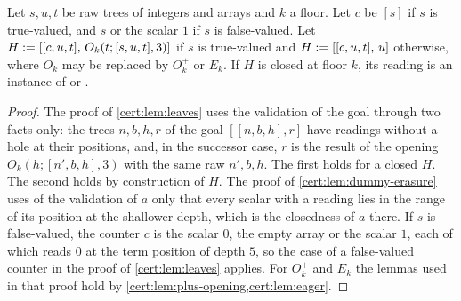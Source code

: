 \begin{lemma}\label{cert:lem:closed-leaf}
Let $s,u,t$ be raw trees of integers and arrays and $k$ a floor. Let $c$ be
$[s]$ if $s$ is true-valued, and $s$ or the scalar $1$ if $s$ is
false-valued. Let $H\mathrel{:=}[[c,u,t],\,O_k(t;[s,u,t],3)]$ if $s$ is true-valued
and $H\mathrel{:=}[[c,u,t],\,u]$ otherwise, where $O_k$ may be replaced by $O^{+}_k$
or $E_k$. If $H$ is closed at floor $k$, its reading is an instance of
 or .
\end{lemma}
\begin{proof}
The proof of \cref{cert:lem:leaves} uses the validation of the goal through two
facts only: the trees $n,b,h,r$ of the goal $[[n,b,h],r]$ have readings
without a hole at their positions, and, in the successor case, $r$ is the
result of the opening $O_k(h;[n',b,h],3)$ with the same raw $n',b,h$. The first
holds for a closed $H$. The second holds by construction of $H$. The proof of
\cref{cert:lem:dummy-erasure} uses of the validation of $a$ only that every
scalar with a reading lies in the range of its position at the shallower depth,
which is the closedness of $a$ there. If $s$ is false-valued, the counter $c$ is
the scalar $0$, the empty array or the scalar $1$, each of which reads $0$ at
the term position of depth $5$, so the case of a false-valued counter in the
proof of \cref{cert:lem:leaves} applies. For $O^{+}_k$ and $E_k$ the lemmas used
in that proof hold by \cref{cert:lem:plus-opening,cert:lem:eager}.
\end{proof}

